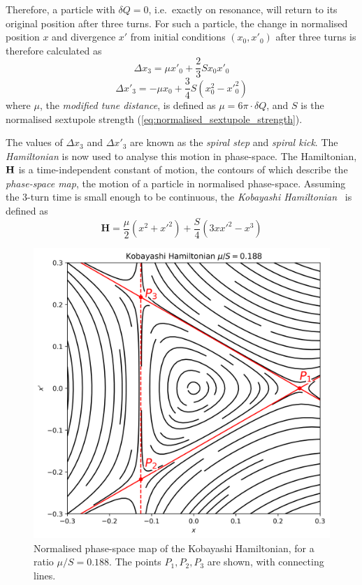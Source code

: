 \documentclass[11pt]{report}
\begin{document}
Therefore, a particle with $\delta Q=0$, i.e.\ exactly on resonance, will return to its original position after three turns. For such a particle, the change in normalised position $x$ and divergence $x'$ from initial conditions $(x_0, x'_0)$ after three turns is therefore calculated as
\begin{equation}
  \Delta x_3 = \mu x'_0 + \frac 23 S x_0x'_0
\end{equation}
\begin{equation}
  \Delta x'_3 = -\mu x_0 + \frac 34 S (x_0^2-x'^2_0)
\end{equation}
where $\mu$, the \textit{modified tune distance}, is defined as $\mu = 6\pi\cdot\delta Q$, and $S$ is the normalised sextupole strength (\autoref{eq:normalised_sextupole_strength}).

The values of $\Delta x_3$ and $\Delta x'_3$ are known as the \textit{spiral step} and \textit{spiral kick}.
The \textit{Hamiltonian} is now used to analyse this motion in phase-space. The Hamiltonian, $\bf H$ is a time-independent constant of motion, the contours of which describe the \textit{phase-space map}, the motion of a particle in normalised phase-space. Assuming the 3-turn time is small enough to be continuous, the \textit{Kobayashi Hamiltonian}~\cite{kobayashi} is defined as
\begin{equation}
  \textbf{H} =\frac\mu 2(x^2+x'^2)+\frac S4(3xx'^2-x^3)
\end{equation}

\begin{figure}
  \centering
  \includegraphics[width=0.6\linewidth]{kobayashi.png}
  \caption{Normalised phase-space map of the Kobayashi Hamiltonian, for a ratio $\mu/S=0.188$. The points $P_1, P_2, P_3$ are shown, with connecting lines.}\label{fig:kobayashi}
\end{figure}
\end{document}
